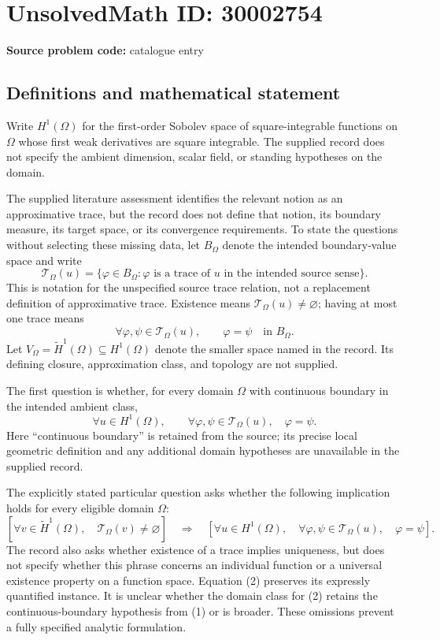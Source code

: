 \documentclass[11pt]{article}
\begin{document}
\section*{UnsolvedMath ID: 30002754}
\textbf{Source problem code:} catalogue entry
\subsection{Definitions and mathematical statement}
Write \(H^1(\Omega)\) for the first-order Sobolev space of square-integrable functions on \(\Omega\) whose first weak derivatives are square integrable. The supplied record does not specify the ambient dimension, scalar field, or standing hypotheses on the domain.

The supplied literature assessment identifies the relevant notion as an approximative trace, but the record does not define that notion, its boundary measure, its target space, or its convergence requirements. To state the questions without selecting these missing data, let \(B_\Omega\) denote the intended boundary-value space and write
\[
\mathcal T_\Omega(u)=\{\varphi\in B_\Omega:\varphi\text{ is a trace of }u\text{ in the intended source sense}\}.
\]
This is notation for the unspecified source trace relation, not a replacement definition of approximative trace. Existence means \(\mathcal T_\Omega(u)\ne\varnothing\); having at most one trace means
\[
\forall\varphi,\psi\in\mathcal T_\Omega(u),\qquad \varphi=\psi
\quad\text{in }B_\Omega.
\]
Let \(V_\Omega=\widetilde H^1(\Omega)\subseteq H^1(\Omega)\) denote the smaller space named in the record. Its defining closure, approximation class, and topology are not supplied.

The first question is whether, for every domain \(\Omega\) with continuous boundary in the intended ambient class,
\[
\forall u\in H^1(\Omega),\qquad
\forall\varphi,\psi\in\mathcal T_\Omega(u),\quad \varphi=\psi.
\tag{1}
\]
Here ``continuous boundary'' is retained from the source; its precise local geometric definition and any additional domain hypotheses are unavailable in the supplied record.

The explicitly stated particular question asks whether the following implication holds for every eligible domain \(\Omega\):
\[
\left[\forall v\in\widetilde H^1(\Omega),\quad
\mathcal T_\Omega(v)\ne\varnothing\right]
\quad\Longrightarrow\quad
\left[\forall u\in H^1(\Omega),\quad
\forall\varphi,\psi\in\mathcal T_\Omega(u),\quad\varphi=\psi\right].
\tag{2}
\]
The record also asks whether existence of a trace implies uniqueness, but does not specify whether this phrase concerns an individual function or a universal existence property on a function space. Equation (2) preserves its expressly quantified instance. It is unclear whether the domain class for (2) retains the continuous-boundary hypothesis from (1) or is broader. These omissions prevent a fully specified analytic formulation.
\end{document}
